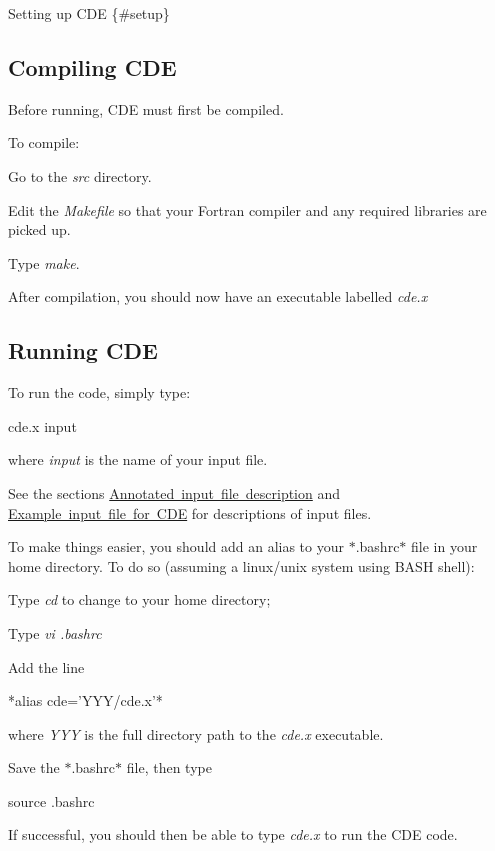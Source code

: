 Setting up C\+DE \{\#setup\}

\subsection*{Compiling C\+DE}

Before running, C\+DE must first be compiled.

To compile\+:


\begin{DoxyItemize}
\item Go to the {\itshape src} directory.
\item Edit the {\itshape Makefile} so that your Fortran compiler and any required libraries are picked up.
\item Type {\itshape make}.
\item After compilation, you should now have an executable labelled {\itshape cde.\+x}
\end{DoxyItemize}

\subsection*{Running C\+DE}

To run the code, simply type\+: \begin{DoxyVerb}    cde.x input
\end{DoxyVerb}


where {\itshape input} is the name of your input file.

See the sections \mbox{\hyperlink{_annotated}{Annotated input file description}} and \mbox{\hyperlink{_example}{Example input file for C\+DE}} for descriptions of input files.

To make things easier, you should add an alias to your $\ast$.bashrc$\ast$ file in your home directory. To do so (assuming a linux/unix system using B\+A\+SH shell)\+:


\begin{DoxyItemize}
\item Type {\itshape cd} to change to your home directory;
\item Type {\itshape vi .bashrc}
\item Add the line
\end{DoxyItemize}

\begin{DoxyVerb}*alias cde='YYY/cde.x'*
\end{DoxyVerb}


where {\itshape Y\+YY} is the full directory path to the {\itshape cde.\+x} executable.


\begin{DoxyItemize}
\item Save the $\ast$.bashrc$\ast$ file, then type
\end{DoxyItemize}

\begin{DoxyVerb}source .bashrc
\end{DoxyVerb}



\begin{DoxyItemize}
\item If successful, you should then be able to type {\itshape cde.\+x} to run the C\+DE code. 
\end{DoxyItemize}